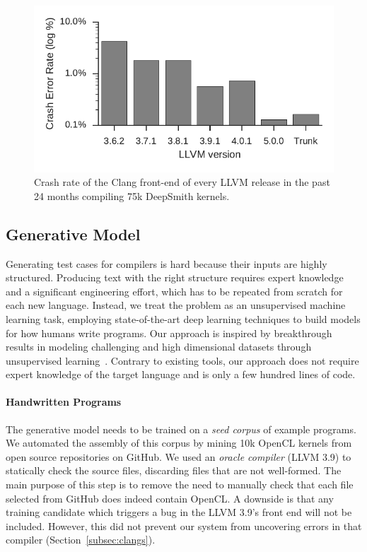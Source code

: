 \begin{figure}
	\centering %
	\includegraphics[width=.45\columnwidth]{build/img/clang-crashes}%
	\caption{%
		Crash rate of the Clang front-end of every LLVM release in the past 24 months compiling 75k DeepSmith kernels.
	}%
	\vspace{-0.8em}
	\label{fig:clangs} %
\end{figure}

\subsection{Generative Model}

Generating test cases for compilers is hard because their inputs are highly structured. Producing text with the right structure requires expert knowledge and a significant engineering effort, which has to be repeated from scratch for each new language. Instead, we treat the problem as an unsupervised machine learning task, employing state-of-the-art deep learning techniques to build models for how humans write programs. Our approach is inspired by breakthrough results in modeling challenging and high dimensional datasets through unsupervised learning~\cite{Raghu2016,Radford2016b,Bowman2015}. Contrary to existing tools, our approach does not require expert knowledge of the target language and is only a few hundred lines of code.


\paragraph{Handwritten Programs} The generative model needs to be trained on a \emph{seed corpus} of example programs. We automated the assembly of this corpus by mining 10k OpenCL kernels from open source repositories on GitHub. We used an \emph{oracle compiler} (LLVM 3.9) to statically check the source files, discarding files that are not well-formed. The main purpose of this step is to remove the need to manually check that each file selected from GitHub does indeed contain OpenCL. A downside is that any training candidate which triggers a bug in the LLVM 3.9's front end will not be included. However, this did not prevent our system from uncovering errors in that compiler (Section~\ref{subsec:clangs}).

